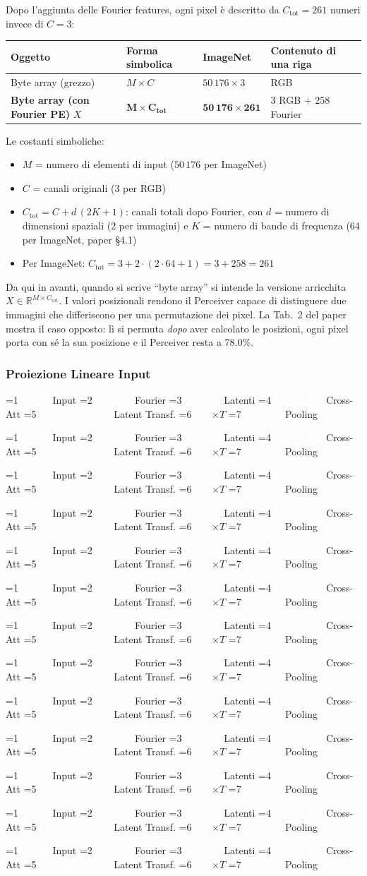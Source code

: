 \documentclass[
  11pt,
]{article}
\newcommand{\pipelinestep}[2]{%
  \ifnum#2=1
    \tikz[baseline=(n.base)]{\node[draw=seccolor, fill=seccolor!15, rounded corners=2pt,
      inner sep=2pt, font=\footnotesize\bfseries] (n) {#1};}%
  \else
    \tikz[baseline=(n.base)]{\node[draw=boxframe, rounded corners=2pt,
      inner sep=2pt, font=\footnotesize] (n) {#1};}%
  \fi
}
\newcommand{\parr}{{\footnotesize\;$\to$\;}}
\newcommand{\pipeline}[1]{%
\begin{tcolorbox}[colback=white, colframe=seccolor!60, boxrule=0.6pt, arc=4pt,
  left=4pt, right=4pt, top=5pt, bottom=5pt, title={\footnotesize\bfseries\color{white} Forward Pass Pipeline}, fonttitle=\footnotesize, coltitle=white, colbacktitle=seccolor!70]
\centering
\pipelinestep{Input}{%
  \ifnum#1=1 1\else 0\fi}%
\parr\pipelinestep{Fourier}{%
  \ifnum#1=2 1\else 0\fi}%
\parr\pipelinestep{Embedding}{%
  \ifnum#1=3 1\else 0\fi}%
\parr\pipelinestep{Latent Array}{%
  \ifnum#1=4 1\else 0\fi}%
\parr\pipelinestep{Cross-Att}{%
  \ifnum#1=5 1\else 0\fi}%
\parr\pipelinestep{Res+MLP}{%
  \ifnum#1=6 1\else 0\fi}%
\\[4pt]
\pipelinestep{Latent Transf.}{%
  \ifnum#1=7 1\else 0\fi}%
\parr\pipelinestep{Res+MLP}{%
  \ifnum#1=8 1\else 0\fi}%
\parr\pipelinestep{$\times T$}{%
  \ifnum#1=9 1\else 0\fi}%
\parr\pipelinestep{Pooling}{%
  \ifnum#1=10 1\else 0\fi}%
\parr\pipelinestep{Classifier}{%
  \ifnum#1=11 1\else 0\fi}%
\parr\pipelinestep{Loss}{%
  \ifnum#1=12 1\else 0\fi}%
\end{tcolorbox}
}
\newcommand{\mystripchip}[3]{%
  \setlength{\fboxsep}{2.8pt}%
  \ifnum#3=#1\relax
    \colorbox{seccolor}{\textcolor{white}{\bfseries #2}}%
  \else
    \colorbox{seccolor!8}{\textcolor{seccolor!55}{#2}}%
  \fi}
\newcommand{\mystriparr}{{\fontsize{8}{8}\selectfont\;\textcolor{seccolor!45}{$\rightarrow$}\;}}
\newcommand{\mystrip}[1]{%
\begin{center}
{\sffamily\fontsize{7.5}{9}\selectfont
\mystripchip{1}{Input}{#1}\mystriparr\mystripchip{2}{Fourier}{#1}\mystriparr\mystripchip{3}{Latenti}{#1}\mystriparr%
\mystripchip{4}{Cross-Att}{#1}\mystriparr\mystripchip{5}{Latent Transf.}{#1}\mystriparr%
\mystripchip{6}{$\times T$}{#1}\mystriparr\mystripchip{7}{Pooling}{#1}}
\end{center}}
\renewcommand{\pipeline}[1]{%
  \ifcase#1\relax
    \mystrip{0}%
    \or\mystrip{1}%
    \or\mystrip{2}%
    \or\mystrip{2}%
    \or\mystrip{3}%
    \or\mystrip{4}%
    \or\mystrip{4}%
    \or\mystrip{5}%
    \or\mystrip{5}%
    \or\mystrip{6}%
    \or\mystrip{7}%
    \or\mystrip{7}%
    \or\mystrip{7}%
  \fi}
\begin{document}
\begin{notabox}[title={\textbf{Checkpoint dimensioni --- fine \S1.4.2}}]
Dopo l'aggiunta delle Fourier features, ogni pixel è descritto da $C_{\text{tot}} = 261$ numeri invece di $C = 3$:

\medskip
\begin{center}
\begin{tabular}{@{}llll@{}}
\toprule
\textbf{Oggetto} & \textbf{Forma simbolica} & \textbf{ImageNet} & \textbf{Contenuto di una riga} \\
\midrule
Byte array (grezzo) & $M \times C$ & $50\,176 \times 3$ & RGB \\
\textbf{Byte array (con Fourier PE)} $X$ & $\boldsymbol{M \times C_{\text{tot}}}$ & $\mathbf{50\,176 \times 261}$ & $3$ RGB $+$ $258$ Fourier \\
\bottomrule
\end{tabular}
\end{center}

\medskip
Le costanti simboliche:
\begin{itemize}\setlength\itemsep{0.1em}
\item $M$ = numero di elementi di input ($50\,176$ per ImageNet)
\item $C$ = canali originali ($3$ per RGB)
\item $C_{\text{tot}} = C + d\,(2K + 1)$: canali totali dopo Fourier, con $d$ = numero di dimensioni spaziali (2 per immagini) e $K$ = numero di bande di frequenza (64 per ImageNet, paper §4.1)
\item Per ImageNet: $C_{\text{tot}} = 3 + 2 \cdot (2 \cdot 64 + 1) = 3 + 258 = 261$
\end{itemize}

\medskip
Da qui in avanti, quando si scrive ``byte array'' si intende la versione arricchita $X \in \mathbb{R}^{M \times C_{\text{tot}}}$. I valori posizionali rendono il Perceiver capace di distinguere due immagini che differiscono per una permutazione dei pixel. La Tab.~2 del paper mostra il caso opposto: lì si permuta \emph{dopo} aver calcolato le posizioni, ogni pixel porta con sé la sua posizione e il Perceiver resta a $78.0\%$.
\end{notabox}

\subsubsection{Proiezione Lineare Input}

\pipeline{3}
\end{document}
